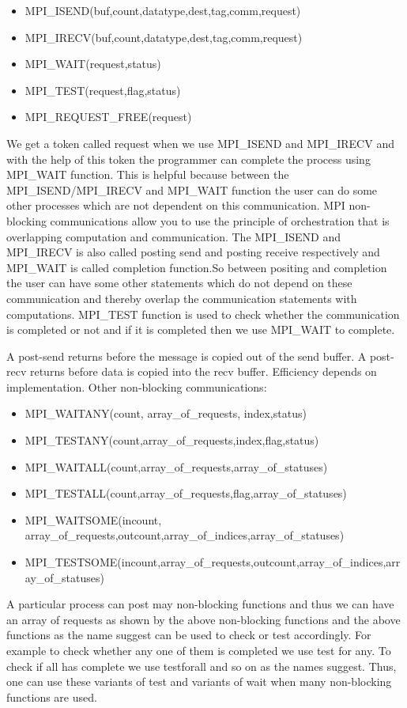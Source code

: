 \documentclass[12pt]{article}
\begin{document}
\begin{itemize}
    \item MPI\_ISEND(buf,count,datatype,dest,tag,comm,request)
    \item MPI\_IRECV(buf,count,datatype,dest,tag,comm,request)
    \item MPI\_WAIT(request,status)
    \item MPI\_TEST(request,flag,status)
    \item MPI\_REQUEST\_FREE(request)
\end{itemize}
We get a token called request when we use MPI\_ISEND and MPI\_IRECV and with the help of this token the programmer can complete the process using MPI\_WAIT function. This is helpful because between the MPI\_ISEND/MPI\_IRECV and MPI\_WAIT function the user can do some other processes which are not dependent on this communication. MPI non-blocking communications allow you to use the principle of orchestration that is overlapping computation and communication. The MPI\_ISEND and MPI\_IRECV is also called posting send and posting receive respectively and MPI\_WAIT is called completion function.So between positing and completion the user can have some other statements which do not depend on these communication and thereby overlap the communication statements with computations. MPI\_TEST function is used to check whether the communication is completed or not and if it is completed then we use MPI\_WAIT to complete.

A post-send returns before the message is copied out of the send buffer. A post-recv returns before data is copied into the recv buffer. Efficiency depends on implementation.
Other non-blocking communications:
\begin{itemize}
    \item MPI\_WAITANY(count, array\_of\_requests, index,status)
    \item MPI\_TESTANY(count,array\_of\_requests,index,flag,status)
    \item MPI\_WAITALL(count,array\_of\_requests,array\_of\_statuses)
    \item MPI\_TESTALL(count,array\_of\_requests,flag,array\_of\_statuses)
    \item MPI\_WAITSOME(incount, array\_of\_requests,outcount,array\_of\_indices,array\_of\_statuses)
    \item MPI\_TESTSOME(incount,array\_of\_requests,outcount,array\_of\_indices,array\_of\_statuses)
\end{itemize}
A particular process can post may non-blocking functions and thus we can have an array of requests as shown by the above non-blocking functions and the above functions as the name suggest can be used to check or test accordingly. For example to check whether any one of them is completed we use test for any. To check if all has complete we use testforall and so on as the names suggest. Thus, one can use these variants of test and variants of wait when many non-blocking functions are used.
\end{document}
